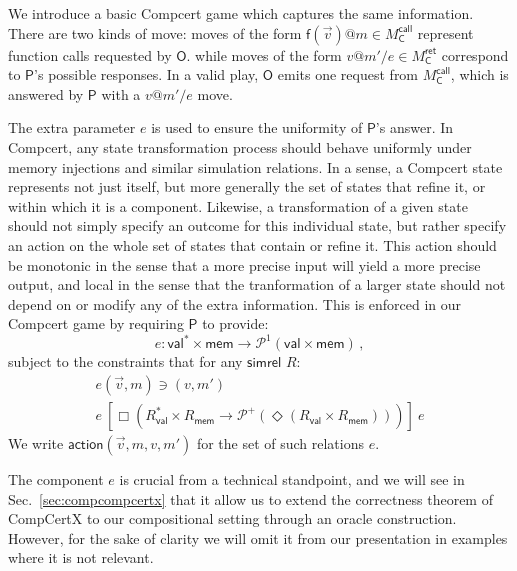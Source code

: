 \documentclass[acmsmall,anonymous]{acmart}
\makeatletter
\newcommand{\kw}[1]{\ensuremath{ \textsf{#1} }}
\newcommand{\ifr}[1]{\ [{#1}]\ }
\newcommand{\EC}{\kw{C}}
\newcommand{\simrel}{\kw{simrel}}
\newcommand{\mcall}[3]{\kw{#1}({#2})@{#3}}
\newcommand{\mretx}[3]{{#1}@{#2}/{#3}}
\makeatother
\begin{document}
We introduce a basic Compcert game which
captures the same information.
There are two kinds of move:
moves of the form
$\mcall{f}{\vec{v}}{m} \in M_\EC^\kw{call}$
represent function calls requested by \kw{O}.
while moves of the form
$\mretx{v}{m'}{e} \in M_\EC^\kw{ret}$
correspond to \kw{P}'s possible responses.
In a valid play,
\kw{O} emits one request from $M_\EC^\kw{call}$,
which is answered by \kw{P} with a $\mretx{v}{m'}{e}$ move.

The extra parameter $e$
is used to ensure the uniformity of \kw{P}'s answer.
In Compcert,
any state transformation process should behave uniformly
under memory injections and similar simulation relations.
In a sense,
a Compcert state represents not just itself,
but more generally the set of states that refine it,
or within which it is a component.
Likewise,
a transformation of a given state
should not simply specify an outcome for this individual state,
but rather specify an action on the whole set of states that contain or refine it.
This action should be monotonic
in the sense that a more precise input will yield a more precise output,
and local in the sense that the tranformation of a larger state
should not depend on or modify any of the extra information.
This is enforced in our Compcert game by requiring \kw{P}
to provide:
\[ e : \kw{val}^* \times \kw{mem} \rightarrow \mathcal{P}^1(\kw{val} \times \kw{mem}) \,, \]
subject to the constraints that for any \simrel{} $R$:
\begin{gather*}
  e(\vec{v}, m) \ni (v, m') \\
  e \ifr{\Box (R_\kw{val}^* \times R_\kw{mem} \rightarrow
         \mathcal{P}^+(\Diamond (R_\kw{val} \times R_\kw{mem})))} e
\end{gather*}
We write $\kw{action}(\vec{v}, m, v, m')$
for the set of such relations $e$.

The component $e$ is crucial from a technical standpoint,
and we will see in Sec.~\ref{sec:compcompcertx}
that it allow us to extend the correctness theorem of CompCertX
to our compositional setting
through an oracle construction.
However, for the sake of clarity
we will omit it from our presentation
in examples where it is not relevant.
\end{document}
